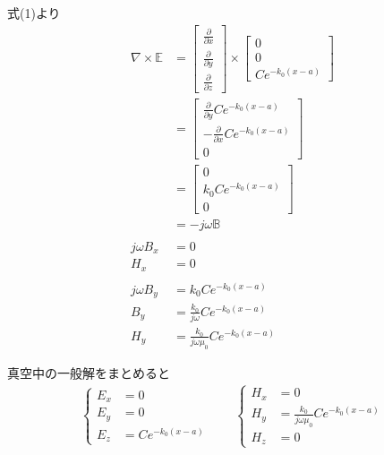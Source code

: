 \documentclass[a4paper,10pt]{bxjsarticle}
\begin{document}
式(1)より
\begin{align*}
    \nabla \times \mathbb{E} 
    & = \begin{bmatrix}
        \frac{\partial}{\partial x}\\
        \frac{\partial}{\partial y}\\
        \frac{\partial}{\partial z}
    \end{bmatrix} \times
    \begin{bmatrix}
        0 \\
        0 \\
        C e^{- k_0 (x - a)}
    \end{bmatrix} \\
    & = \begin{bmatrix}
        \frac{\partial}{\partial y} C e^{- k_0 (x - a)} \\
        -\frac{\partial}{\partial x} C e^{- k_0 (x - a)}\\
        0
    \end{bmatrix} \\
    & = \begin{bmatrix}
        0 \\
        k_0 C e^{- k_0 (x - a)}\\
        0
    \end{bmatrix} \\
    &= -j \omega \mathbb{B} \\
    \\
    j\omega B_x &= 0 \\
    H_x &= 0 \\
    \\
    j\omega B_y &= k_0 C e^{- k_0 (x - a)} \\
    B_y &= \frac{k_0}{j\omega} C e^{- k_0 (x - a)} \\
    H_y &= \frac{k_0}{j\omega\mu_0} C e^{- k_0 (x - a)}
\end{align*}

真空中の一般解をまとめると
\begin{align*}
    \begin{cases}
        E_x &= 0 \\
        E_y &= 0 \\
        E_z &= C e^{- k_0 (x - a)}
    \end{cases} \qquad
    \begin{cases}
        H_x &= 0 \\
        H_y &= \frac{k_0}{j\omega\mu_0} C e^{- k_0 (x - a)} \\
        H_z &= 0
    \end{cases}
\end{align*}
\end{document}
